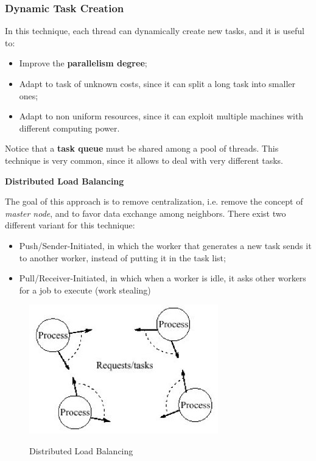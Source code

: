 \subsubsection{Dynamic Task Creation}
In this technique, each thread can dynamically create new tasks, and it is useful to:

\begin{itemize}
    \item Improve the \textbf{parallelism degree};
    \item Adapt to task of unknown costs, since it can split a long task into smaller ones;
    \item Adapt to non uniform resources, since it can exploit multiple machines with different computing power.
\end{itemize}

Notice that a \textbf{task queue} must be shared among a pool of threads. This technique is very common, since it allows to deal with very different tasks.

\textbf{Distributed Load Balancing}

The goal of this approach is to remove centralization, i.e. remove the concept of \textit{master node}, and to favor data exchange among neighbors. There exist two different variant for this technique:

\begin{itemize}
    \item Push/Sender-Initiated, in which the worker that generates a new task sends it to another worker, instead of putting it in the task list;
    \item Pull/Receiver-Initiated, in which when a worker is idle, it asks other workers for a job to execute (work stealing)
\end{itemize}

\begin{figure}[h!]
		\centering
		\includegraphics[scale = 2.0]{img/distributed load balancing.jpg}
        \label{distr load balancing}
        \caption{Distributed Load Balancing}
\end{figure}

